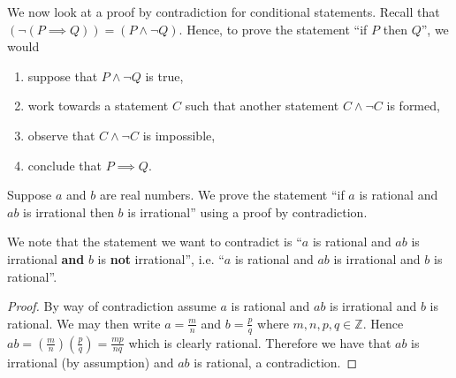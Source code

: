 \newpage

We now look at a proof by contradiction for conditional statements. Recall that $(\lnot(P \implies Q)) = (P \land \lnot Q)$. Hence, to prove the statement ``if $P$ then $Q$'', we would
\begin{enumerate}
    \item suppose that $P \land \lnot Q$ is true,
    \item work towards a statement $C$ such that another statement $C \land \lnot C$ is formed,
    \item observe that $C \land \lnot C$ is impossible,
    \item conclude that $P \implies Q$.
\end{enumerate}

\begin{example}
    Suppose $a$ and $b$ are real numbers. We prove the statement ``if $a$ is rational and $ab$ is irrational then $b$ is irrational'' using a proof by contradiction.
    
    We note that the statement we want to contradict is ``$a$ is rational and $ab$ is irrational \textbf{and} $b$ is \textbf{not} irrational'', i.e. ``$a$ is rational and $ab$ is irrational and $b$ is rational''.
    \begin{proof}
        By way of contradiction assume $a$ is rational and $ab$ is irrational and $b$ is rational. We may then write $a = \frac mn$ and $b = \frac pq$ where $m, n, p, q \in \mathbb{Z}$. Hence $ab = \left(\frac mn\right)\left(\frac pq\right) = \frac{mp}{nq}$ which is clearly rational. Therefore we have that $ab$ is irrational (by assumption) and $ab$ is rational, a contradiction.
    \end{proof}
\end{example}

